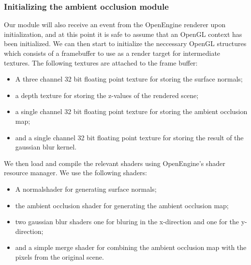 \subsubsection*{Initializing the ambient occlusion module}
Our module will also receive an event from the OpenEngine renderer
upon initialization, and at this point it is safe to assume that
an OpenGL context has been initialized. We can then start to
initialize the neccessary OpenGL structures which consists of a
framebuffer to use as a render target for intermediate textures. The
following textures are attached to the frame buffer:
\begin{itemize}
\item A three channel 32 bit floating point texture for storing the
  surface normals;
\item a depth texture for storing the z-values of the rendered scene;
\item a single channel 32 bit floating point texture for storing the
  ambient occlusion map;
  \item and a single channel 32 bit floating point texture for storing the
  result of the gaussian blur kernel.
\end{itemize}
We then load and compile the relevant shaders using OpenEngine's
shader resource manager. We use the following shaders:
\begin{itemize}
\item A normalshader for generating surface normals;
\item the ambient occlusion shader for generating the ambient
  occlusion map;
\item two gaussian blur shaders one for bluring in the x-direction and
  one for the y-direction;
\item and a simple merge shader for combining the ambient occlusion
  map with the pixels from the original scene.
\end{itemize}

